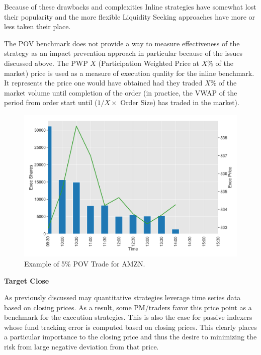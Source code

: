 Because of these drawbacks and complexities Inline strategies have somewhat lost their popularity and the more flexible Liquidity Seeking approaches  have more or less taken their place.


The POV benchmark does not provide a way to measure effectiveness of the strategy as an impact prevention approach in particular because of the issues discussed above. The PWP $X$ (Participation Weighted Price at $X$\% of the market) price is used as a measure of execution quality for the inline benchmark. It represents the price one would have obtained had they traded $X$\% of the market volume until completion of the order (in practice, the VWAP of the period from order start until ($1/X \times$ Order Size) has traded in the market). \twomedskip

	\begin{figure}[!ht]
	\centering
	\includegraphics[width=\textwidth]{chapters/chapter_exec_models/figures/pov.png} 
	\caption{Example of 5\% POV Trade for AMZN. \label{fig:pov}}
	\end{figure}


\noindent\textbf{Target Close} \twomedskip


As previously discussed may quantitative strategies leverage time series data based on closing prices. As a result, some PM/traders favor this price point as a benchmark for the execution strategies. This is also the case for passive indexers whose fund tracking error is computed based on closing prices. This clearly places a particular importance to the closing price and thus the desire to minimizing the risk from large negative deviation from that price.


